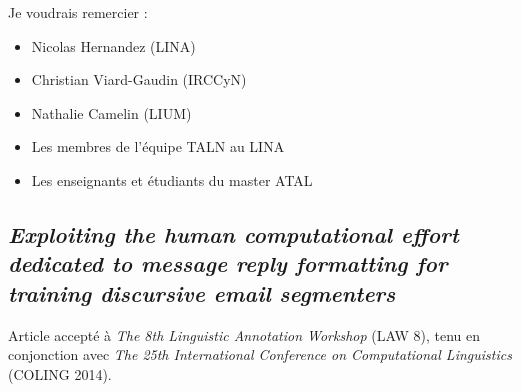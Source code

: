 \documentclass[a4paper,12pt,twoside]{report}
\begin{document}
\begin{acknowledgements}


Je voudrais remercier :

\begin{itemize}
	\item Nicolas Hernandez (LINA)
	\vspace*{3mm}
	\item Christian Viard-Gaudin (IRCCyN)
	\vspace*{3mm}
	\item Nathalie Camelin (LIUM)
	\vspace*{3mm}
	\item Les membres de l'équipe TALN au LINA
	\vspace*{3mm}
	\item Les enseignants et étudiants du master ATAL
\end{itemize}

\end{acknowledgements}

\body















\begin{appendices}

\chapter{\textit{Exploiting the human computational effort dedicated to message reply formatting for training discursive email segmenters}}

Article accepté à \textit{The 8th Linguistic Annotation Workshop} (LAW 8), tenu en conjonction avec \textit{The 25th International Conference on Computational Linguistics} (COLING 2014).



\end{appendices}



\end{document}
